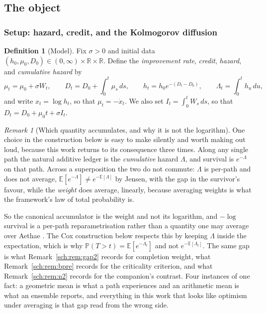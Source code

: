 \documentclass[11pt]{article}
\numberwithin{equation}{section}
\theoremstyle{plain}
\theoremstyle{definition}
\newtheorem{definition}[theorem]{Definition}
\theoremstyle{remark}
\newtheorem{remark}[theorem]{Remark}
\newcommand{\E}{\mathbb{E}}
\newcommand{\PP}{\mathbb{P}}
\newcommand{\R}{\mathbb{R}}
\begin{document}
\subsection{The object}\label{gr1:sub:object}\label{tc:sub:model}\label{sh:sub:model}

\subsubsection{Setup: hazard, credit, and the Kolmogorov diffusion}
\label{sh:subsub:setup}

\begin{definition}[Model]\label{sh:def:model}
Fix $\sigma>0$ and initial data $(h_0,\mu_0,D_0)\in(0,\infty)\times\R\times\R$.
Define the \emph{improvement rate}, \emph{credit}, \emph{hazard}, and
\emph{cumulative hazard} by
\begin{equation}\label{sh:eq:model}
\mu_t=\mu_0+\sigma W_t,\qquad
D_t=D_0+\int_0^t\mu_s\,ds,\qquad
h_t=h_0e^{-(D_t-D_0)},\qquad
\Lambda_t=\int_0^t h_u\,du,
\end{equation}
and write $x_t=\log h_t$, so that $\mu_t=-\dot x_t$. We also set
$I_t=\int_0^t W_s\,ds$, so that $D_t=D_0+\mu_0t+\sigma I_t$.
\end{definition}

\begin{remark}[Which quantity accumulates, and why it is not the
logarithm]\label{sh:rem:accumulator}
One choice in the construction below is easy to make silently and worth
making out loud, because this work returns to its consequence three
times. Along any single path the natural additive ledger is the
\emph{cumulative} hazard $\Lambda$, and survival is $e^{-\Lambda}$ on
that path. Across a superposition the two do not commute: $\Lambda$ is
per-path and does not average, $\E[e^{-\Lambda}]\neq e^{-\E[\Lambda]}$
by Jensen, with the gap in the survivor's favour, while the
\emph{weight} does average, linearly, because averaging weights is what
the framework's law of total probability is.

So the canonical accumulator is the weight and not its logarithm, and
$-\log$ survival is a per-path reparametrisation rather than a quantity
one may average over Aethae \cite{Aethus}. The Cox construction below
respects this by keeping $\Lambda$ inside the expectation, which is why
$\PP(T>t)=\E[e^{-\Lambda_t}]$ and not $e^{-\E[\Lambda_t]}$. The same gap is what Remark~\ref{sch:rem:gap2} records for completion
weight, what Remark~\ref{sch:rem:bpre} records for the criticality
criterion, and what Remark~\ref{sch:rem:n2} records for the companion's
contrast. Four instances of one fact: a geometric mean is what a path
experiences and an arithmetic mean is what an ensemble reports, and
everything in this work that looks like optimism under averaging is that
gap read from the wrong side.
\end{remark}
\end{document}
